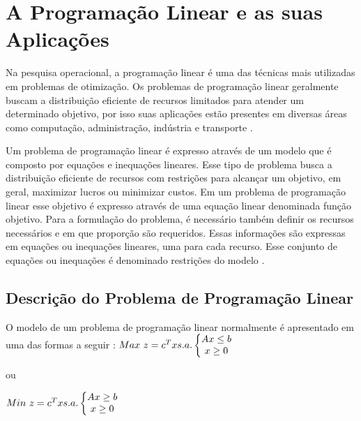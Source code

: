 \chapter{A Programação Linear e as suas Aplicações}

Na pesquisa operacional, a programação linear é uma das técnicas mais utilizadas em problemas de otimização. Os problemas de programação linear geralmente buscam a distribuição eficiente de recursos limitados para atender um determinado objetivo, por isso suas aplicações estão presentes em diversas áreas como computação, administração, indústria e transporte \cite{Engecom}.

Um problema de programação linear é expresso através de um modelo que é composto por equações e inequações lineares. Esse tipo de problema busca a distribuição eficiente de recursos com restrições para alcançar um objetivo, em geral, maximizar lucros ou minimizar custos. Em um problema de programação linear esse objetivo é expresso através de uma equação linear denominada função objetivo. Para a formulação do problema, é necessário também definir os recursos necessários e em que proporção são requeridos. Essas informações são expressas em equações ou inequações lineares, uma para cada recurso. Esse conjunto de equações ou inequações é denominado restrições do modelo \cite{Engecom}.

\section{Descrição do Problema de Programação Linear}
O modelo de um problema de programação linear normalmente é apresentado em uma das formas a seguir \cite{Passos}:
$\\Max\ z = c^{T}x \\\\s.a.\left\{\begin{matrix}
Ax\leq b\\x\geq 0 
\end{matrix}\right.$  

ou  

$\\Min\ z = c^{T}x \\\\s.a.\left\{\begin{matrix}
Ax\geq  b\\x\geq 0 
\end{matrix}\right.$


